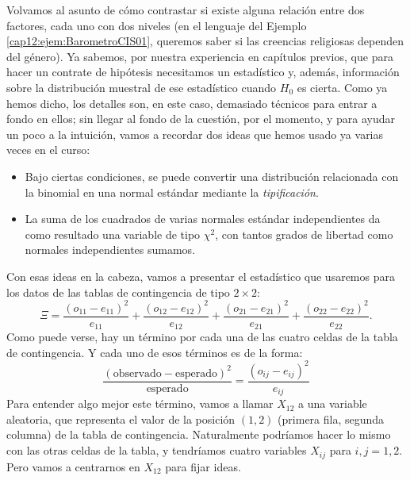 Volvamos al asunto de cómo contrastar si existe alguna relación entre dos factores, cada uno con dos niveles (en el lenguaje del Ejemplo \ref{cap12:ejem:BarometroCIS01}, queremos saber si las creencias religiosas dependen del género). Ya sabemos, por nuestra experiencia en capítulos previos, que para hacer un contrate de hipótesis necesitamos un estadístico y, además, información sobre la distribución muestral de ese estadístico cuando $H_0$ es cierta. Como ya hemos dicho, los detalles son, en este caso, demasiado técnicos para entrar a fondo en ellos; sin llegar al fondo de la cuestión, por el momento, y para ayudar un poco a la intuición, vamos a recordar dos ideas que hemos usado ya varias veces en el curso:
\begin{itemize}

  \item Bajo ciertas condiciones, se puede convertir una distribución relacionada con la binomial en una normal estándar mediante la {\em tipificación}.

  \item La suma de los cuadrados de varias normales estándar independientes da como resultado una variable de tipo $\chi^2$, con tantos grados de libertad como normales independientes sumamos.

\end{itemize}
Con esas ideas en la cabeza, vamos a presentar el estadístico que usaremos para los datos de las tablas de contingencia de tipo $2\times 2$:
    \begin{equation}\label{cap12:ecu:EstadisticoChi2ParaTablas2por2}
    \Xi=\dfrac{(o_{11}-e_{11})^2}{e_{11}}+\dfrac{(o_{12}-e_{12})^2}{e_{12}}+\dfrac{(o_{21}-e_{21})^2}{e_{21}}+\dfrac{(o_{22}-e_{22})^2}{e_{22}}.
    \end{equation}
Como puede verse, hay un término por cada una de las cuatro celdas de la tabla de contingencia.  Y cada uno de esos términos es de la forma:
    \[\dfrac{(\mbox{observado}-\mbox{esperado})^2}{\mbox{esperado}}= \dfrac{(o_{ij}-e_{ij})^2}{e_{ij}}\]
Para entender algo mejor este término, vamos a llamar $X_{12}$ a una variable aleatoria, que representa el valor de la posición $(1,2)$ (primera fila, segunda columna) de la tabla de contingencia. Naturalmente podríamos hacer lo mismo con las otras celdas de la tabla, y tendríamos cuatro variables $X_{ij}$ para $i,j=1,2$. Pero vamos a centrarnos en $X_{12}$ para fijar ideas.
